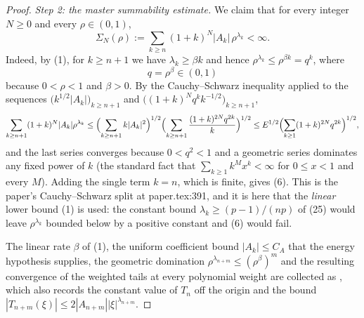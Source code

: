 \begin{proof}
\emph{Step 2: the master summability estimate.}  We claim that for every
integer $N\ge0$ and every $\rho\in(0,1)$,
\begin{equation}\tag{6}
  \Sigma_N(\rho):=\sum_{k\ge n}(1+k)^{N}|A_k|\,\rho^{\lambda_k}<\infty .
\end{equation}
Indeed, by (1), for $k\ge n+1$ we have $\lambda_k\ge\beta k$ and hence
$\rho^{\lambda_k}\le\rho^{\beta k}=q^{k}$, where
\[
  q=\rho^{\beta}\in(0,1)
\]
because $0<\rho<1$ and $\beta>0$.  By the Cauchy--Schwarz inequality applied to
the sequences $\bigl(k^{1/2}|A_k|\bigr)_{k\ge n+1}$ and
$\bigl((1+k)^{N}q^{k}k^{-1/2}\bigr)_{k\ge n+1}$,
\[
  \sum_{k\ge n+1}(1+k)^{N}|A_k|\rho^{\lambda_k}
  \le\Bigl(\sum_{k\ge n+1}k|A_k|^2\Bigr)^{1/2}
    \Bigl(\sum_{k\ge n+1}\frac{(1+k)^{2N}q^{2k}}{k}\Bigr)^{1/2}
  \le E^{1/2}\Bigl(\sum_{k\ge1}(1+k)^{2N}q^{2k}\Bigr)^{1/2},
\]
and the last series converges because $0<q^2<1$ and a geometric series
dominates any fixed power of $k$ (the standard fact that
$\sum_{k\ge1}k^{M}x^{k}<\infty$ for $0\le x<1$ and every $M$).  Adding the
single term $k=n$, which is finite, gives (6).  This is the paper's
Cauchy--Schwarz split at paper.tex:391, and it is here that the \emph{linear}
lower bound (1) is used: the constant bound $\lambda_k\ge(p-1)/(np)$ of (25)
would leave $\rho^{\lambda_k}$ bounded below by a positive constant and (6)
would fail.

The linear rate $\beta$ of (1), the uniform coefficient bound
$|A_k|\le C_A$ that the energy hypothesis supplies, the geometric domination
$\rho^{\lambda_{n+m}}\le(\rho^{\beta})^{m}$ and the resulting convergence of
the weighted tails at every polynomial weight are collected as
, which also records the constant value
of $T_n$ off the origin and the bound
$|T_{n+m}(\xi)|\le2|A_{n+m}||\xi|^{\lambda_{n+m}}$.


\end{proof}
